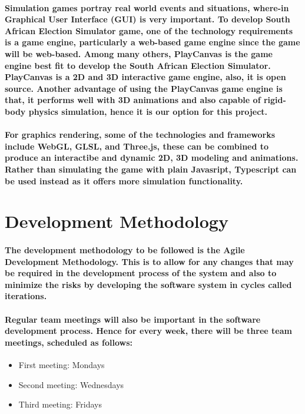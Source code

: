 \documentclass{article}
\begin{document}
\paragraph{Simulation games  portray real world events and situations, where-in Graphical User Interface (GUI) is very important. To develop South African
Election Simulator game, one of the technology requirements is a game engine, particularly a web-based game engine since the game will be web-based. Among 
many others, PlayCanvas is the game engine best fit to develop the South African Election Simulator. PlayCanvas is a 2D and 3D interactive game engine, also, 
it is open source. Another advantage of using the PlayCanvas game engine is that, it performs well with 3D animations and also capable of rigid-body physics simulation,  hence it is our option for this project.}

\paragraph{For graphics rendering, some of the technologies and frameworks include WebGL, GLSL, and Three.js, these can be combined to produce an interactibe and dynamic 2D, 3D modeling and animations.
Rather than simulating the game with plain Javasript, Typescript can be used instead as it offers more simulation functionality.}

\section{Development Methodology}

\paragraph{The development methodology to be followed is the Agile Development Methodology. This is to allow for any changes that may be required in the development process of the system and also to minimize the risks by developing the software system in cycles called iterations.}

\paragraph{Regular team meetings will also be important in the software development process. Hence for every week, there will be three team meetings, scheduled as follows:}

\begin{itemize}
\item First meeting: Mondays
\item Second meeting: Wednesdays
\item Third meeting: Fridays
\end{itemize}
\end{document}

